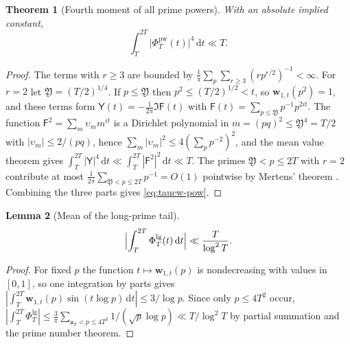 \documentclass[11pt,a4paper]{article}
\numberwithin{equation}{section}
\newtheorem{theorem}{Theorem}[section]
\newtheorem{lemma}[theorem]{Lemma}
\theoremstyle{definition}
\theoremstyle{remark}
\newcommand{\dd}{\,\mathrm dt}
\begin{document}
\begin{theorem}[Fourth moment of all prime powers]\label{thm:taucw-pow}
With an absolute implied constant,
\begin{equation}\label{eq:taucw-pow}
\int_T^{2T}\bigl|\Phi^{\mathrm{pw}}_T(t)\bigr|^4\dd\ll T.
\end{equation}
\end{theorem}
\begin{proof}
The terms with $r\ge3$ are bounded by $\frac1\pi\sum_p\sum_{r\ge3}(rp^{r/2})^{-1}<\infty$. For $r=2$ let $\mathfrak Y=(T/2)^{1/4}$. If $p\le\mathfrak Y$ then $p^2\le(T/2)^{1/2}<t$, so $\mathbf w_{1,t}(p^2)=1$, and these terms form $\mathsf Y(t)=-\frac1{2\pi}\Im\mathsf F(t)$ with $\mathsf F(t)=\sum_{p\le\mathfrak Y}p^{-1}p^{2it}$. The function $\mathsf F^2=\sum_m\upsilon_mm^{it}$ is a Dirichlet polynomial in $m=(pq)^2\le\mathfrak Y^4=T/2$ with $|\upsilon_m|\le2/(pq)$, hence $\sum_m|\upsilon_m|^2\le4(\sum_pp^{-2})^2$, and the mean value theorem \cite{MontgomeryVaughan} gives $\int_T^{2T}|\mathsf Y|^4\dd\ll\int_T^{2T}|\mathsf F^2|^2\dd\ll T$. The primes $\mathfrak Y<p\le2T$ with $r=2$ contribute at most $\frac1{2\pi}\sum_{\mathfrak Y<p\le2T}p^{-1}=O(1)$ pointwise by Mertens' theorem \cite{Mertens1874}. Combining the three parts gives \eqref{eq:taucw-pow}.
\end{proof}

\begin{lemma}[Mean of the long-prime tail]\label{lem:taucw-mean}
\begin{equation}\label{eq:taucw-mean}
\Bigl|\int_T^{2T}\Phi^{\mathrm{lg}}_T(t)\dd\Bigr|\ll\frac T{\log^2T}.
\end{equation}
\end{lemma}
\begin{proof}
For fixed $p$ the function $t\mapsto\mathbf w_{1,t}(p)$ is nondecreasing with values in $[0,1]$, so one integration by parts gives $|\int_T^{2T}\mathbf w_{1,t}(p)\sin(t\log p)\dd|\le3/\log p$. Since only $p\le4T^2$ occur, $|\int_T^{2T}\Phi^{\mathrm{lg}}_T|\le\frac3\pi\sum_{\mathfrak a_T<p\le4T^2}1/(\sqrt p\log p)\ll T/\log^2T$ by partial summation and the prime number theorem.
\end{proof}
\end{document}
